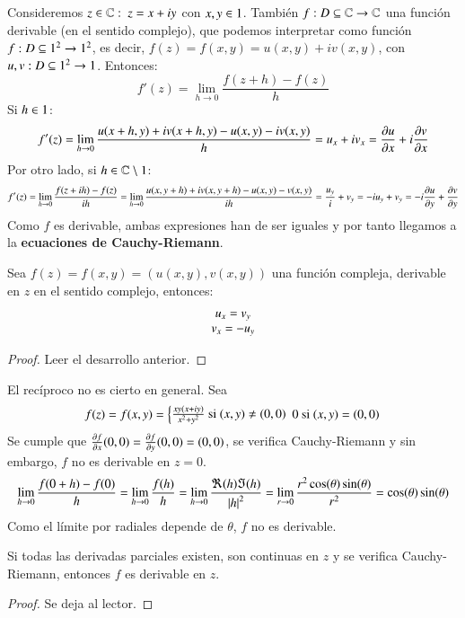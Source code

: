 Consideremos $z\in \mathbb{C}:\ z = x+iy$ con $x,y\in 1$. También $f : D \subseteq \mathbb{C} \to \mathbb{C}$ una función derivable (en el sentido complejo), que podemos interpretar como función $f: D\subseteq 1^2 \to 1^2$, es decir, $f(z) = f(x, y) = u(x, y) + i v(x, y)$, con $u,v: D \subseteq 1^2 \to 1$. Entonces:
$$
    f'(z) = \lim_{h\to 0} \frac{f(z+h) - f(z)}{h}
$$
Si $h\in 1$:
$$
    f'(z) = \lim_{h\to 0} \frac{u(x+h, y) + iv(x+h, y) - u(x, y) - iv(x, y)}{h} = u_x + i v_x = \frac{\partial u}{\partial x} + i \frac{\partial v}{\partial x}
$$
Por otro lado, si $h \in \mathbb{C}\setminus 1$:
$$
    f'(z) = \lim_{h\to 0} \frac{f(z+ih) - f(z)}{ih} = \lim_{h\to 0} \frac{u(x, y+h) + iv(x, y+h) - u(x, y)- v(x, y)}{ih} = \frac{u_y}{i} + v_y = -iu_y + v_y = -i\frac{\partial u}{\partial y} + \frac{\partial v}{\partial y}
$$
Como $f$ es derivable, ambas expresiones han de ser iguales y por tanto llegamos a la \textbf{ecuaciones de Cauchy-Riemann}.

\begin{pro}
    Sea $f(z) = f(x, y) = (u(x, y), v(x, y))$ una función compleja, derivable en $z$ en el sentido complejo, entonces:
    $$
    \Mx{
    u_x = v_y\\
    v_x = -u_y
    }
    $$
\end{pro}

\begin{proof}
    Leer el desarrollo anterior.
\end{proof}

\begin{obs}
    El recíproco no es cierto en general. Sea
    $$
    f(z) = f(x, y) = \left\{
    \Mx{
    \frac{xy(x+iy)}{x^2+y^2} \text{ si } (x, y) \neq (0, 0)
    }\\
    0 \text{ si } (x, y) = (0, 0)
    \right.
    $$
    Se cumple que $\frac{\partial f}{\partial x}(0, 0) = \frac{\partial f}{\partial y}(0, 0) = (0, 0)$, se verifica Cauchy-Riemann y sin embargo, $f$ no es derivable en $z = 0$.
    $$
        \lim_{h\to 0} \frac{f(0+h) - f(0)}{h} = \lim_{h\to 0} \frac{f(h)}{h} = \lim_{h\to 0} \frac{\Re(h)\Im(h)}{\left|h\right|^2} = \lim_{r \to 0} \frac{r^2\cos (\theta) \sin (\theta)}{r^2} = \cos(\theta)\sin(\theta)
    $$
    Como el límite por radiales depende de $\theta$, $f$ no es derivable.
\end{obs}

\begin{pro}
    Si todas las derivadas parciales existen, son continuas en $z$ y se verifica Cauchy-Riemann, entonces $f$ es derivable en $z$.
\end{pro}
\begin{proof}
    Se deja al lector.
\end{proof}

